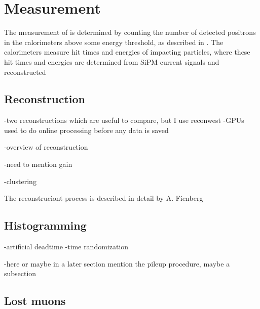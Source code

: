 
\thispagestyle{myheadings}

\graphicspath{{Body/Figures/RatioAnalysis/}{Body/Figures/RatioAnalysis/MethodOverview/}}

\chapter{\texorpdfstring{\wa}{wa} Measurement}
\label{chapter:SpinPrecessionMeasurement}




The measurement of \wa is determined by counting the number of detected positrons in the calorimeters above some energy threshold, as described in . The calorimeters measure hit times and energies of impacting particles, where these hit times and energies are determined from SiPM current signals and reconstructed



\section{Reconstruction}
\label{sec:ReconWest}



-two reconstructions which are useful to compare, but I use reconwest
-GPUs used to do online processing before any data is saved





-overview of reconstruction

-need to mention gain


-clustering


The reconstruciont process is described in detail by A. Fienberg \cite{AFThesis}



\section{Histogramming}
\label{sec:Histogramming}


-artificial deadtime
-time randomization

-here or maybe in a later section mention the pileup procedure, maybe a subsection


\section{Lost muons}
\label{sec:lostmuons}


